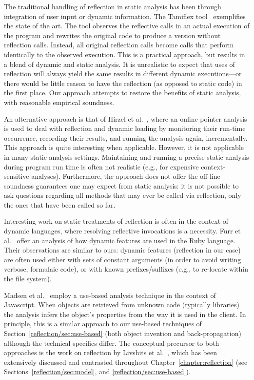 The traditional handling of reflection in static analysis has been
through integration of user input or dynamic information.  The
Tamiflex tool~\cite{icse/BoddenSSOM11} exemplifies the state of the
art. The tool observes the reflective calls in an actual execution of
the program and rewrites the original code to produce a version
without reflection calls. Instead, all original reflection calls
become calls that perform identically to the observed execution. This
is a practical approach, but results in a blend of dynamic and static
analysis.
It is unrealistic to expect that uses of reflection will always yield
the same results in different dynamic executions---or there would be
little reason to have the reflection (as opposed to static code) in
the first place. Our approach attempts to restore the benefits of
static analysis, with reasonable empirical soundness.

An alternative approach is that of Hirzel et
al.~\cite{ecoop/HirzelDH04,toplas/HirzelDDH07}, where an online
pointer analysis is used to deal with reflection and dynamic loading
by monitoring their run-time occurrence, recording their results, and
running the analysis again, incrementally. This approach is quite
interesting when applicable. However, it is not applicable in many
static analysis settings. Maintaining and running a precise static
analysis during program run time is often not realistic (e.g., for
expensive context-sensitive analyses). Furthermore, the approach does
not offer the off-line soundness guarantees one may expect from static
analysis: it is not possible to ask questions regarding all methods
that may ever be called via reflection, only the ones that have been
called so far.

Interesting work on static treatments of reflection is often in the
context of dynamic languages, where resolving reflective invocations
is a necessity.  Furr et al.~\cite{oopsla/FurrAF09} offer an analysis
of how dynamic features are used in the Ruby language. Their
observations are similar to ours: dynamic features (reflection in our
case) are often used either with sets of constant arguments (in order
to avoid writing verbose, formulaic code), or with known
prefixes/suffixes (e.g., to re-locate within the file system).

Madsen et al.~\cite{sigsoft/MadsenLF13} employ a use-based analysis
technique in the context of Javascript. When objects are retrieved
from unknown code (typically libraries) the analysis infers the
object's properties from the way it is used in the client. In
principle, this is a similar approach to our use-based techniques of
Section~\ref{reflection/sec:use-based} (both object invention and
back-propagation) although the technical specifics differ. The
conceptual precursor to both approaches is the work on reflection by
Livshits et al.~\cite{aplas/LivshitsWL05,livshits:thesis}, which has
been extensively discussed and contrasted throughout
Chapter~\ref{chapter:reflection} (see
Sections~\ref{reflection/sec:model}, and
\ref{reflection/sec:use-based}).

